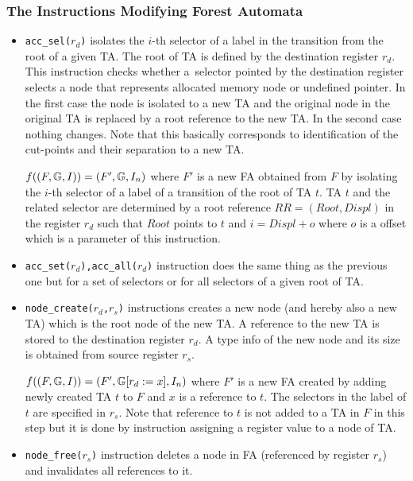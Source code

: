 \subsubsection{The Instructions Modifying Forest Automata}
\begin{itemize}
	\item {\tt acc\_sel($r_d$)} isolates the $i$-th selector of a label
		in the transition from the root of a given TA.
		The root of TA is defined by the destination register $r_d$.
		This instruction checks whether a~selector pointed by the destination register
		selects a node that represents allocated memory node or undefined pointer.
		In the first case the node is isolated to a new TA and the original node in the
		original TA is replaced by a root reference to the new TA.
		In the second case nothing changes.
		Note that this basically corresponds to identification of the cut-points
		and their separation to a new TA.
		
		$f((F, \mathbb{G}, I)) = (F', \mathbb{G}, I_n)$
		where $F'$ is a new FA obtained from $F$ by isolating
		the $i$-th selector of a label of a transition of the root of TA $t$.
		TA $t$ and the related selector are determined by a root reference $RR=(Root, Displ)$
		in the register $r_d$ such that $Root$ points to $t$ and $i=Displ+o$
		where $o$ is a offset which is a parameter of this instruction.

	\item {\tt acc\_set($r_d$),acc\_all($r_d$)} instruction does the same thing as the previous one
		but for a set of selectors or for all selectors of a given root of TA.
	
	\item {\tt node\_create($r_d$,$r_s$)} instructions creates a new node
		(and hereby also a new TA) which is the root node of the new TA.
		A reference to the new TA is stored to the destination register $r_d$.
		A type info of the new node and its size is obtained from source
		register $r_s$.
		
		$f((F, \mathbb{G}, I)) = (F', 
		\mathbb{G} [
			r_{d} := x], I_n)$
		where $F'$ is a new FA created by adding newly created TA $t$ to $F$
		and $x$ is a reference to $t$.
		The selectors in the label of $t$ are specified in $r_s$. 
		Note that reference to $t$ is not added to a TA in $F$ in this step
		but it is done by instruction assigning a register value to a
		node of TA.
	
	\item {\tt node\_free($r_s$)} instruction deletes a node in FA (referenced by register $r_s$) and
		invalidates all references to it.
		

\end{itemize}
